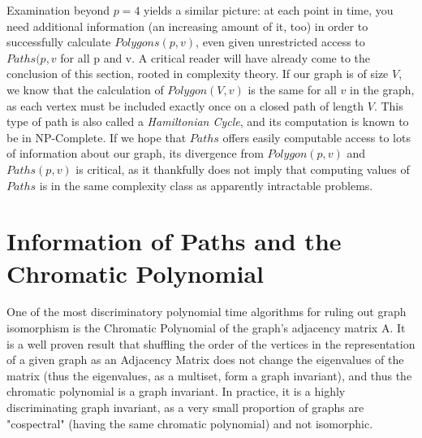\documentclass[a4paper,12pt]{article}
\begin{document}
Examination beyond \(p = 4\) yields a similar picture: at each point in time, you need additional information (an increasing amount of it, too) in order to successfully calculate \(Polygons(p, v)\), even given unrestricted access to \(Paths(p, v\) for all p and v. A critical reader will have already come to the conclusion of this section, rooted in complexity theory.  If our graph is of size \(V\), we know that the calculation of \(Polygon(V, v)\) is the same for all \(v\) in the graph, as each vertex must be included exactly once on a closed path of length \(V\). This type of path is also called a \emph{Hamiltonian Cycle}, and its computation is known to be in NP-Complete.  If we hope that \(Paths\) offers easily computable access to lots of information about our graph, its divergence from \(Polygon(p, v)\) and \(Paths(p, v)\) is critical, as it thankfully does not imply that computing values of \(Paths\) is in the same complexity class as apparently intractable problems.



\section{Information of Paths and the Chromatic Polynomial}

One of the most discriminatory polynomial time algorithms for ruling out graph isomorphism is the Chromatic Polynomial of the graph's adjacency matrix A.  It is a well proven result that shuffling the order of the vertices in the representation of a given graph as an Adjacency Matrix does not change the eigenvalues of the matrix (thus the eigenvalues, as a multiset, form a graph invariant), and thus the chromatic polynomial is a graph invariant. In practice, it is a highly discriminating graph invariant, as a very small proportion of graphs are "cospectral" (having the same chromatic polynomial) and not isomorphic.
\end{document}
